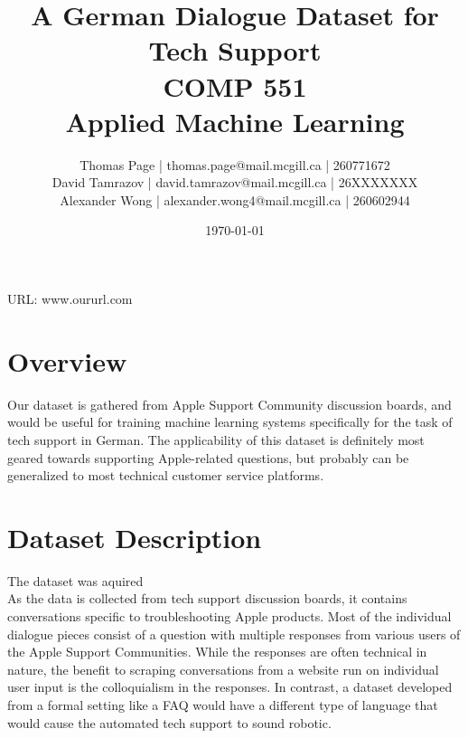\documentclass[12pt]{article}
\title{A German Dialogue Dataset for Tech Support\\ COMP 551 \\ Applied Machine Learning} %
\author{
Thomas Page | thomas.page@mail.mcgill.ca | 260771672 \\
David Tamrazov | david.tamrazov@mail.mcgill.ca | 26XXXXXXX \\
Alexander Wong | alexander.wong4@mail.mcgill.ca | 260602944} %
\date{\today} %
\begin{document}
\maketitle %


%

\begin{center}
URL: www.oururl.com
\end{center}


\section{Overview}
Our dataset is gathered from Apple Support Community discussion boards, and would be useful for training machine learning systems specifically for the task of tech support in German. The applicability of this dataset is definitely most geared towards supporting Apple-related questions, but probably can be generalized to most technical customer service platforms.


\section{Dataset Description}
The dataset was aquired  \\

As the data is collected from tech support discussion boards, it contains conversations specific to troubleshooting Apple products. Most of the individual dialogue pieces consist of a question with multiple responses from various users of the Apple Support Communities. While the responses are often technical in nature, the benefit to scraping conversations from a website run on individual user input is the colloquialism in the responses. In contrast, a dataset developed from a formal setting like a FAQ would have a different type of language that would cause the automated tech support to sound robotic.
\end{document}
